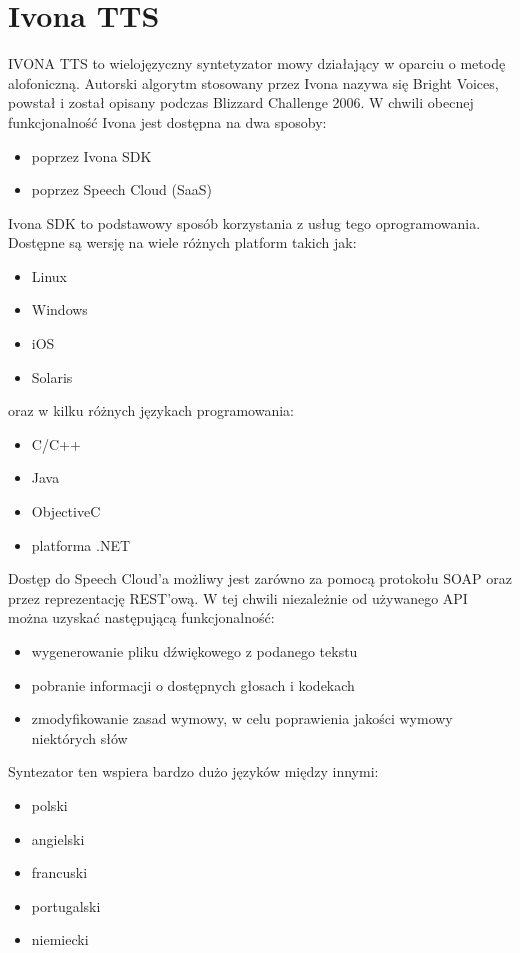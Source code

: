 \section{Ivona TTS}
IVONA TTS to wielojęzyczny syntetyzator mowy działający w oparciu o metodę alofoniczną. Autorski algorytm stosowany przez Ivona nazywa się Bright Voices,  powstał i został opisany podczas Blizzard Challenge 2006. W chwili obecnej funkcjonalność Ivona jest dostępna na dwa sposoby:
\begin{itemize}
	\item poprzez Ivona SDK
	\item poprzez Speech Cloud (SaaS)
\end{itemize}
Ivona SDK to podstawowy sposób korzystania z usług tego oprogramowania. Dostępne są wersję na wiele różnych platform takich jak:
\begin{itemize}
	\item Linux
	\item Windows
	\item iOS
	\item Solaris
\end{itemize}
oraz w kilku różnych językach programowania:
\begin{itemize}
	\item C/C++
	\item Java
	\item ObjectiveC
	\item platforma .NET
\end{itemize}
Dostęp do Speech Cloud'a możliwy jest zarówno za pomocą protokołu SOAP oraz przez reprezentację REST'ową. W tej chwili niezależnie od używanego API można uzyskać następującą funkcjonalność:
\begin{itemize}
	\item wygenerowanie pliku dźwiękowego z podanego tekstu
	\item pobranie informacji o dostępnych głosach i kodekach
	\item zmodyfikowanie zasad wymowy, w celu poprawienia jakości wymowy niektórych słów
\end{itemize}
Syntezator ten wspiera bardzo dużo języków między innymi:
 \begin{itemize}
	\item polski
	\item angielski
	\item francuski
	\item portugalski
	\item niemiecki
\end{itemize}
